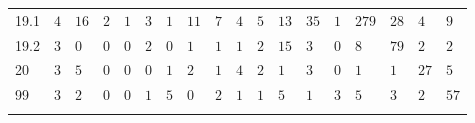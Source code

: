 \begin{table}[!htbp]
\begin{tabularx}{\textwidth}{XXXXXXXXXXXXXXXXXX}
19.1 & $4$ & $16$ & $2$ & $1$ & $3$ & $1$ & $11$ & $7$ & $4$ & $5$ & $13$ & $35$ & $1$ & $279$ & $28$ & $4$ & $9$ \\ 
19.2 & $3$ & $0$ & $0$ & $0$ & $2$ & $0$ & $1$ & $1$ & $1$ & $2$ & $15$ & $3$ & $0$ & $8$ & $79$ & $2$ & $2$ \\ 
20 & $3$ & $5$ & $0$ & $0$ & $0$ & $1$ & $2$ & $1$ & $4$ & $2$ & $1$ & $3$ & $0$ & $1$ & $1$ & $27$ & $5$ \\ 
99 & $3$ & $2$ & $0$ & $0$ & $1$ & $5$ & $0$ & $2$ & $1$ & $1$ & $5$ & $1$ & $3$ & $5$ & $3$ & $2$ & $57$ \\ 
\hline \\[-1.8ex] 
\end{tabularx} 
\end{table} 
